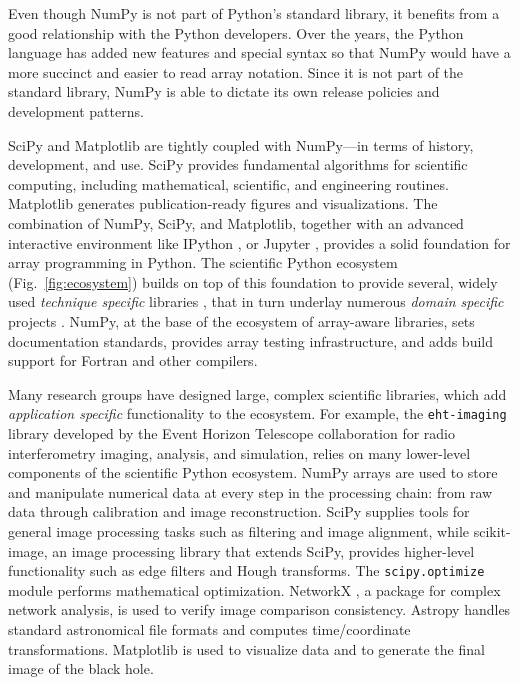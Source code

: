 \documentclass[twocolumn]{article}
\begin{document}
Even though NumPy is not part of Python's standard library,
it benefits from a good relationship with the Python developers.
Over the years, the Python language has added new features and
special syntax so that NumPy would have a more succinct and 
easier to read array notation.
Since it is not part of the standard library, NumPy is able to
dictate its own release policies and development patterns.

SciPy and Matplotlib are tightly coupled with NumPy---in terms of
history, development, and use.
SciPy provides fundamental algorithms for scientific computing,
including mathematical, scientific, and engineering routines.
Matplotlib generates publication-ready figures and visualizations.
The combination of NumPy, SciPy, and Matplotlib, together with
an advanced interactive environment like IPython \cite{perez2007ipython},
or Jupyter \cite{Kluyver:2016aa}, provides a solid foundation for array
programming in Python.
The scientific Python ecosystem (Fig.~\ref{fig:ecosystem}) builds on top of
this foundation to provide several, widely used \emph{technique specific}
libraries \cite{pedregosa2011scikit,vanderwalt2014scikit,SciPyProceedings_11},
that in turn underlay numerous \emph{domain specific} projects
\cite{astropy:2013,astropy:2018,cock2009biopython,millman2007analysis,sunpy2015,2018EGUGA..2012146H}.
NumPy, at the base of the ecosystem of array-aware libraries,
sets documentation standards, provides array testing infrastructure,
and adds build support for Fortran and other compilers.

Many research groups have designed large,
complex scientific libraries, which add \emph{application specific} functionality
to the ecosystem.
For example, the \texttt{eht-imaging} library \cite{chael2019ehtim} developed by
the Event Horizon Telescope collaboration for radio interferometry imaging,
analysis, and simulation, relies on many lower-level components of the scientific Python
ecosystem.
NumPy arrays are used to store and manipulate numerical data at every step
in the processing chain: from raw data through calibration and image
reconstruction.
SciPy supplies tools for general image processing tasks such as
filtering and image alignment, while scikit-image, an image processing
library that extends SciPy, provides higher-level functionality such as
edge filters and Hough transforms.
The \texttt{scipy.optimize} module performs mathematical optimization.
NetworkX \cite{SciPyProceedings_11}, a package for complex
network analysis, is used to verify image comparison consistency.
Astropy \cite{astropy:2013, astropy:2018} handles standard
astronomical file formats and computes time/coordinate transformations.
Matplotlib is used to visualize data and to generate the final image of the black hole.
\end{document}
